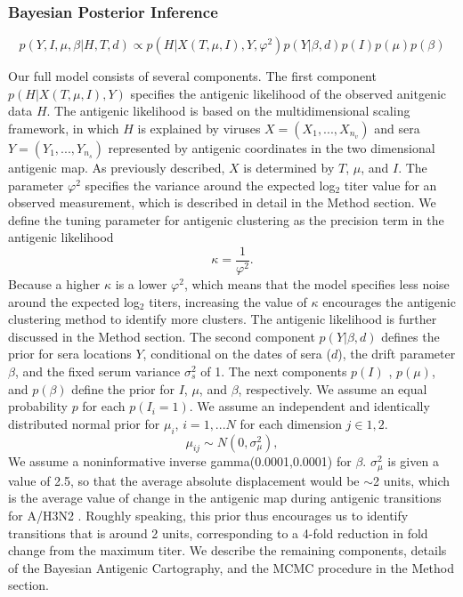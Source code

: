 \documentclass[11pt,oneside,letterpaper]{article}
\newcommand{\mdssd}{\varphi}						%
\begin{document}
\subsubsection*{Bayesian Posterior Inference}

\begin{equation}
  p(Y, I, \mu ,  \beta | H, T, d) \propto  p(H| X(T, \mu, I), Y , \mdssd^2) p(Y|  \beta, d) p(I) p(\mu) p(\beta)
\end{equation}

Our full model consists of several components.
The first component $p(H|X(T, \mu, I),Y )$ specifies the antigenic likelihood of the observed anitgenic data $H$.
The antigenic likelihood is based on the multidimensional scaling framework, in which $H$ is explained by viruses $X=(X_1, ..., X_{n_v} )$ and sera $Y = (Y_1, ..., Y_{n_{s}} )$ represented by antigenic coordinates in the two dimensional antigenic map.
As previously described, $X$ is determined by $T$, $\mu$, and $I$.
The parameter $\mdssd^2$ specifies the variance around the expected log$_2$ titer value for an observed measurement, which is described in detail in the Method section.
We define the tuning parameter for antigenic clustering as the precision term in the antigenic likelihood
\begin{equation}
  \kappa = \frac{1}{\mdssd^2}.
\end{equation}
Because a higher $\kappa$ is a lower $\mdssd^2$, which means that the model specifies less noise around the expected log$_2$ titers, increasing the value of $\kappa$ encourages the antigenic clustering method to identify more clusters.
The antigenic likelihood is further discussed in the Method section.
The second component $p(Y|  \beta , d)$ defines the prior for sera locations $Y$, conditional on the dates of sera ($d$), the drift parameter $\beta$, and the fixed serum variance $\sigma^2_s$ of 1. 
The next components $p(I)$ , $p(\mu)$, and $p(\beta)$ define the prior for $I$, $\mu$, and $\beta$, respectively.
We assume an equal probability $p$ for each $p(I_i = 1)$.
We assume an independent and identically distributed normal prior for $\mu_i$, $i=1,...N$ for each dimension $j \in {1,2}$.
\begin{equation}
   \mu_{ij}  \sim N( 0 , \sigma^2_\mu)			,
\end{equation}
We assume a noninformative inverse gamma(0.0001,0.0001) for $\beta$.
$\sigma^2_\mu$ is given a value of 2.5, so that the average absolute displacement would be $\sim$2 units, which is the average value of change in the antigenic map during antigenic transitions for A/H3N2 \cite{jong_antigenic_2007}.
Roughly speaking, this prior thus encourages us to identify transitions that is around 2 units, corresponding to a 4-fold reduction in fold change from the maximum titer.
We describe the remaining components, details of the Bayesian Antigenic Cartography, and the MCMC procedure in the Method section.
\end{document}
